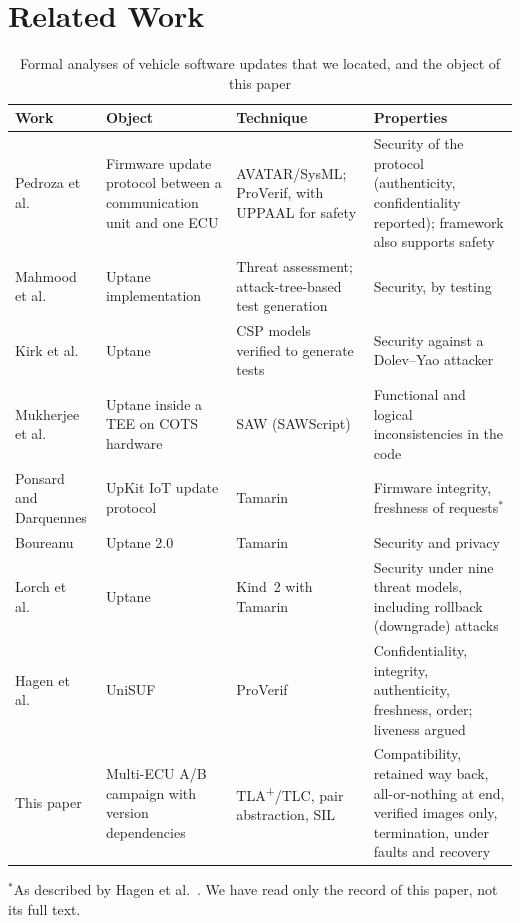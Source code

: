 \documentclass[journal]{IEEEtran}
\newcommand{\tla}{TLA\textsuperscript{+}}
\begin{document}
\section{Related Work}
\label{sec:related}

\begin{table}[t]
\caption{Formal analyses of vehicle software updates that we located, and the object of this paper}
\label{tab:related}
\centering
\footnotesize
\begin{tabular}{@{}p{3.3cm}p{3.6cm}p{3.4cm}p{6.3cm}@{}}
\toprule
Work & Object & Technique & Properties \\
\midrule
Pedroza et al.\ \cite{pedroza2011} & Firmware update protocol between a communication unit and one ECU \cite{idrees2011} & AVATAR/SysML; ProVerif, with UPPAAL for safety & Security of the protocol (authenticity, confidentiality reported); framework also supports safety \\
Mahmood et al.\ \cite{mahmood2020,mahmood2022} & Uptane implementation & Threat assessment; attack-tree-based test generation & Security, by testing \\
Kirk et al.\ \cite{kirk2021,kirk2023} & Uptane & CSP models verified to generate tests & Security against a Dolev--Yao attacker \\
Mukherjee et al.\ \cite{mukherjee2021} & Uptane inside a TEE on COTS hardware & SAW (SAWScript) & Functional and logical inconsistencies in the code \\
Ponsard and Darquennes \cite{ponsard2021} & UpKit IoT update protocol & Tamarin & Firmware integrity, freshness of requests$^\ast$ \\
Boureanu \cite{boureanu2023} & Uptane 2.0 & Tamarin & Security and privacy \\
Lorch et al.\ \cite{lorch2024} & Uptane & Kind~2 with Tamarin & Security under nine threat models, including rollback (downgrade) attacks \\
Hagen et al.\ \cite{hagen2026} & UniSUF & ProVerif & Confidentiality, integrity, authenticity, freshness, order; liveness argued \\
\midrule
This paper & Multi-ECU A/B campaign with version dependencies & \tla{}/TLC, pair abstraction, SIL & Compatibility, retained way back, all-or-nothing at end, verified images only, termination, under faults and recovery \\
\bottomrule
\end{tabular}

\smallskip
\raggedright\scriptsize $^\ast$As described by Hagen et al.\ \cite{hagen2026}. We have read only the record of this paper, not its full text.
\end{table}
\end{document}

